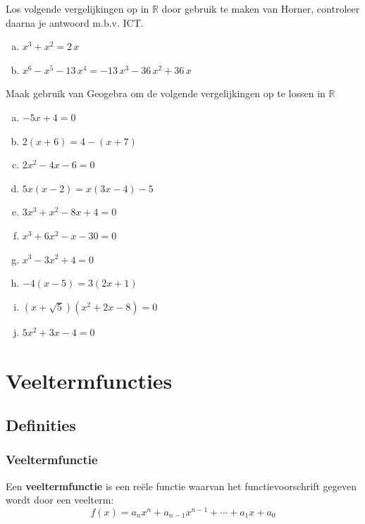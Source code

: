\documentclass[12pt,twoside,a4paper]{article}
\begin{document}
\begin{oefening}
  Los volgende vergelijkingen op in $\mathbb{R}$ door gebruik te maken van Horner, controleer daarna je antwoord m.b.v. ICT.\\
  \begin{enumerate}[(a)]
    \itemsep.8em
  \item $\displaystyle{x}^{3}+{x}^{2}=2\,x$
  \item $\displaystyle{x}^{6}-{x}^{5}-13\,{x}^{4}=-13\,{x}^{3}-36\,{x}^{2}+36\,x$
  \end{enumerate}
\end{oefening}

\begin{oefening}
  Maak gebruik van Geogebra om de volgende vergelijkingen op te lossen in $\mathbb{R}$
  \begin{multicols}{2}
    \begin{enumerate}[(a)]
      \itemsep0.8em
    \item $-5x+4=0$
    \item $2(x+6)=4-(x+7)$
    \item $2x^2-4x-6=0$
    \item $5x(x-2)=x(3x-4)-5$
    \item $3x^3+x^2-8x+4=0$
    \item $x^3+6x^2-x-30=0$
    \item $x^3-3x^2+4=0$
    \item $-4(x-5)=3(2x+1)$
    \item $(x+\sqrt{5})(x^2+2x-8)=0$
    \item $5x^2+3x-4=0$
    \end{enumerate}
  \end{multicols}
\end{oefening}


\cleardoublepage
\section{Veeltermfuncties}

\subsection{Definities}

\subsubsection*{Veeltermfunctie}
\begin{mdframed}
  Een {\bf veeltermfunctie} is een reële functie waarvan het functievoorschrift gegeven wordt door een veelterm:
  $$f(x)= a_nx^n + a_{n-1}x^{n-1} + \cdots + a_1x + a_0$$
\end{mdframed}
\end{document}
